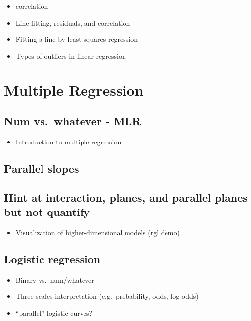 \documentclass[]{book}
\providecommand{\tightlist}{%
  \setlength{\itemsep}{0pt}\setlength{\parskip}{0pt}}
\begin{document}
\begin{itemize}
\tightlist
\item
  correlation
\item
  Line fitting, residuals, and correlation
\item
  Fitting a line by least squares regression
\item
  Types of outliers in linear regression
\end{itemize}

\hypertarget{mult-reg}{%
\chapter{Multiple Regression}\label{mult-reg}}

\hypertarget{num-vs.whatever---mlr}{%
\section{Num vs.~whatever - MLR}\label{num-vs.whatever---mlr}}

\begin{itemize}
\tightlist
\item
  Introduction to multiple regression
\end{itemize}

\hypertarget{parallel-slopes}{%
\section{Parallel slopes}\label{parallel-slopes}}

\hypertarget{hint-at-interaction-planes-and-parallel-planes-but-not-quantify}{%
\section{Hint at interaction, planes, and parallel planes but not quantify}\label{hint-at-interaction-planes-and-parallel-planes-but-not-quantify}}

\begin{itemize}
\tightlist
\item
  Visualization of higher-dimensional models (rgl demo)
\end{itemize}

\hypertarget{logistic-regression}{%
\section{Logistic regression}\label{logistic-regression}}

\begin{itemize}
\tightlist
\item
  Binary vs.~num/whatever
\item
  Three scales interpretation (e.g.~probability, odds, log-odds)
\item
  ``parallel'' logistic curves?
\end{itemize}
\end{document}
